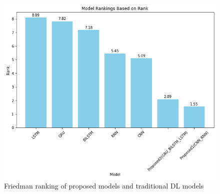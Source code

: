 \documentclass[a4paper,fleqn]{cas-sc}
\begin{document}
\begin{figure}[!ht]
\centering
\includegraphics[width=\textwidth]{friedman ranking}
\caption{Friedman ranking of proposed models and traditional DL models}
\label{Line plot12}
\end{figure}
\end{document}
